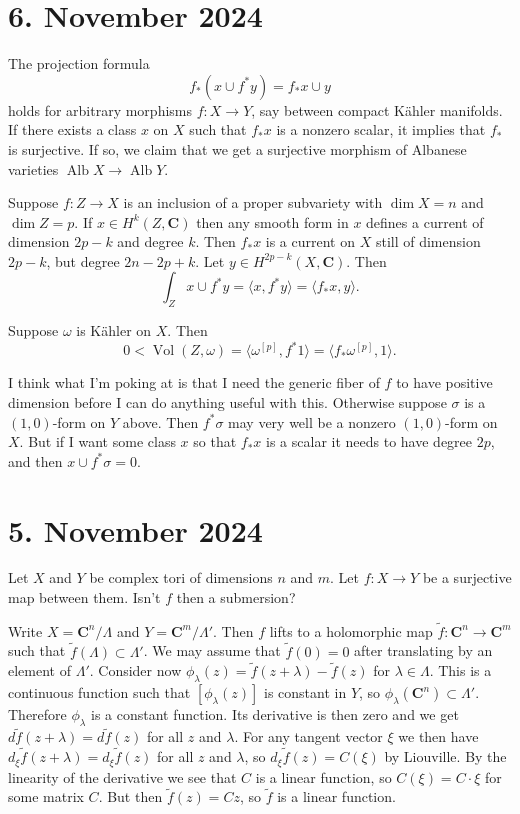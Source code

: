 \documentclass[11pt]{amsart}
\theoremstyle{definition}
\def\^#1{^{[#1]}}
\def\CC{\mathbf{C}}
\DeclareMathOperator{\Vol}{Vol}
\def\<{\langle}
\def\>{\rangle}
\begin{document}
\section{6. November 2024}

The projection formula
\[
f_*(x \cup f^*y) = f_*x \cup y
\]
holds for arbitrary morphisms $f : X \to Y$, say between compact K\"ahler manifolds.
If there exists a class $x$ on $X$ such that $f_*x$ is a nonzero scalar, it implies that $f_*$ is surjective.
If so, we claim that we get a surjective morphism of Albanese varieties $\operatorname{Alb} X \to \operatorname{Alb} Y$.


Suppose $f : Z \to X$ is an inclusion of a proper subvariety with $\dim X = n$ and $\dim Z = p$.
If $x \in H^k(Z,\CC)$ then any smooth form in $x$ defines a current of dimension $2p - k$ and degree $k$.
Then $f_*x$ is a current on $X$ still of dimension $2p - k$, but degree $2n - 2p + k$.
Let $y \in H^{2p-k}(X,\CC)$.
Then
\[
\int_Z x \cup f^*y = \< x, f^*y \> = \< f_*x, y \>.
\]

Suppose $\omega$ is K\"ahler on $X$.
Then
\[
0 < \Vol(Z, \omega)
= \< \omega\^p, f^* 1 \>
= \< f_* \omega\^p, 1 \>.
\]


I think what I'm poking at is that I need the generic fiber of $f$ to have positive dimension before I can do anything useful with this.
Otherwise suppose $\sigma$ is a $(1,0)$-form on $Y$ above.
Then $f^*\sigma$ may very well be a nonzero $(1,0)$-form on $X$.
But if I want some class $x$ so that $f_*x$ is a scalar it needs to have degree $2p$, and then $x \cup f^*\sigma = 0$.



\section{5. November 2024}


Let $X$ and $Y$ be complex tori of dimensions $n$ and $m$.
Let $f : X \to Y$ be a surjective map between them.
Isn't $f$ then a submersion?

Write $X = \CC^n / \Lambda$ and $Y = \CC^m / \Lambda'$.
Then $f$ lifts to a holomorphic map $\tilde f : \CC^n \to \CC^m$ such that $\tilde f(\Lambda) \subset \Lambda'$.
We may assume that $\tilde f(0) = 0$ after translating by an element of $\Lambda'$.
Consider now $\phi_\lambda(z) = \tilde f(z + \lambda) - \tilde f(z)$ for $\lambda \in \Lambda$.
This is a continuous function such that $[\phi_\lambda(z)]$ is constant in $Y$, so $\phi_\lambda(\CC^n) \subset \Lambda'$.
Therefore $\phi_\lambda$ is a constant function.
Its derivative is then zero and we get $d \tilde f(z + \lambda) = d \tilde f(z)$ for all $z$ and $\lambda$.
For any tangent vector $\xi$ we then have $d_\xi \tilde f(z + \lambda) = d_\xi \tilde f(z)$ for all $z$ and $\lambda$, so $d_\xi \tilde f(z) = C(\xi)$ by Liouville.
By the linearity of the derivative we see that $C$ is a linear function, so $C(\xi) = C \cdot \xi$ for some matrix $C$.
But then $\tilde f(z) = C z$, so $\tilde f$ is a linear function.
\end{document}
